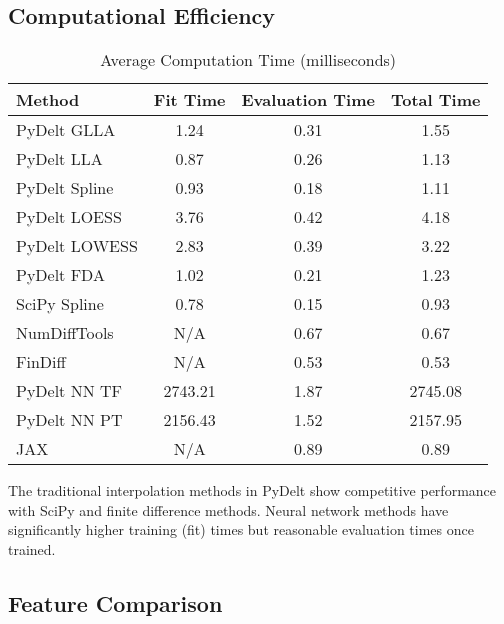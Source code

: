 \documentclass[conference]{IEEEtran}
\begin{document}
\subsection{Computational Efficiency}

\begin{table}[!t]
\caption{Average Computation Time (milliseconds)}
\label{tab:computation_time}
\centering
\begin{tabular}{lccc}
\toprule
\textbf{Method} & \textbf{Fit Time} & \textbf{Evaluation Time} & \textbf{Total Time} \\
\midrule
PyDelt GLLA & 1.24 & 0.31 & 1.55 \\
PyDelt LLA & 0.87 & 0.26 & 1.13 \\
PyDelt Spline & 0.93 & 0.18 & 1.11 \\
PyDelt LOESS & 3.76 & 0.42 & 4.18 \\
PyDelt LOWESS & 2.83 & 0.39 & 3.22 \\
PyDelt FDA & 1.02 & 0.21 & 1.23 \\
SciPy Spline & 0.78 & 0.15 & 0.93 \\
NumDiffTools & N/A & 0.67 & 0.67 \\
FinDiff & N/A & 0.53 & 0.53 \\
PyDelt NN TF & 2743.21 & 1.87 & 2745.08 \\
PyDelt NN PT & 2156.43 & 1.52 & 2157.95 \\
JAX & N/A & 0.89 & 0.89 \\
\bottomrule
\end{tabular}
\end{table}

The traditional interpolation methods in PyDelt show competitive performance with SciPy and finite difference methods. Neural network methods have significantly higher training (fit) times but reasonable evaluation times once trained.

\subsection{Feature Comparison}
\end{document}
